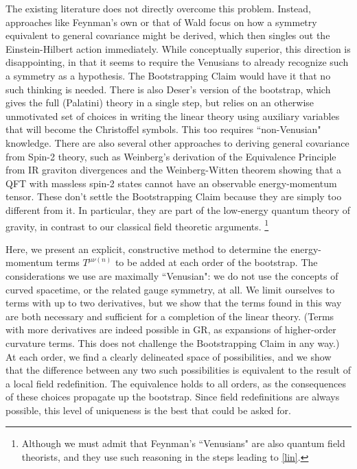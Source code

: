 \documentclass[aps,physrev,preprint,groupedaddress]{revtex4-2}
\begin{document}
The existing literature does not directly overcome this problem. Instead, approaches like Feynman's own or that of Wald \cite{Wald} focus on how a symmetry equivalent to general covariance might be derived, which then singles out the Einstein-Hilbert action immediately. While conceptually superior, this direction is disappointing, in that it seems to require the Venusians to already recognize such a symmetry as a hypothesis. The Bootstrapping Claim would have it that no such thinking is needed. There is also Deser's \cite{Deser} version of the bootstrap, which gives the full (Palatini) theory in a single step, but relies on an otherwise unmotivated set of choices in writing the linear theory using auxiliary variables that will become the Christoffel symbols. This too requires ``non-Venusian" knowledge. There are also several other approaches to deriving general covariance from Spin-2 theory, such as Weinberg's derivation of the Equivalence Principle from IR graviton divergences \cite{Weinberg IR} and the Weinberg-Witten theorem \cite{WW} showing that a QFT with massless spin-2 states cannot have an observable energy-momentum tensor. These don't settle the Bootstrapping Claim because they are simply too different from it. In particular, they are part of the low-energy quantum theory of gravity, in contrast to our classical field theoretic arguments. \footnote{Although we must admit that Feynman's ``Venusians" are also quantum field theorists, and they use such reasoning in the steps leading to \eqref{lin}.} 

Here, we present an explicit, constructive method to determine the energy-momentum terms \(T^{\mu\nu(n)}\) to be added at each order of the bootstrap. The considerations we use are maximally ``Venusian": we do not use the concepts of curved spacetime, or the related gauge symmetry, at all. We limit ourselves to terms with up to two derivatives, but we show that the terms found in this way are both necessary and sufficient for a completion of the linear theory. (Terms with more derivatives are indeed possible in GR, as expansions of higher-order curvature terms. This does not challenge the Bootstrapping Claim in any way.) At each order, we find a clearly delineated space of possibilities, and we show that the difference between any two such possibilities is equivalent to the result of a local field redefinition. The equivalence holds to all orders, as the consequences of these choices propagate up the bootstrap. Since field redefinitions are always possible, this level of uniqueness is the best that could be asked for.
\end{document}
